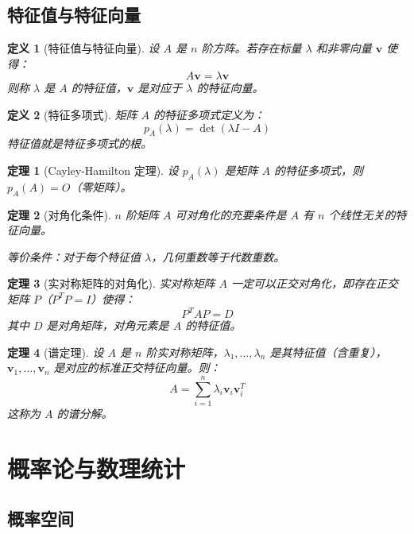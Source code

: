 \documentclass[12pt]{article}
\newtheorem{theorem}{定理}[section]
\newtheorem{definition}{定义}[section]
\begin{document}
\subsection{特征值与特征向量}

\begin{definition}[特征值与特征向量]
设 $A$ 是 $n$ 阶方阵。若存在标量 $\lambda$ 和非零向量 $\mathbf{v}$ 使得：
$$A\mathbf{v} = \lambda\mathbf{v}$$
则称 $\lambda$ 是 $A$ 的特征值，$\mathbf{v}$ 是对应于 $\lambda$ 的特征向量。
\end{definition}

\begin{definition}[特征多项式]
矩阵 $A$ 的特征多项式定义为：
$$p_A(\lambda) = \det(\lambda I - A)$$
特征值就是特征多项式的根。
\end{definition}

\begin{theorem}[Cayley-Hamilton 定理]
设 $p_A(\lambda)$ 是矩阵 $A$ 的特征多项式，则 $p_A(A) = O$（零矩阵）。
\end{theorem}

\begin{theorem}[对角化条件]
$n$ 阶矩阵 $A$ 可对角化的充要条件是 $A$ 有 $n$ 个线性无关的特征向量。

等价条件：对于每个特征值 $\lambda$，几何重数等于代数重数。
\end{theorem}

\begin{theorem}[实对称矩阵的对角化]
实对称矩阵 $A$ 一定可以正交对角化，即存在正交矩阵 $P$（$P^T P = I$）使得：
$$P^T A P = D$$
其中 $D$ 是对角矩阵，对角元素是 $A$ 的特征值。
\end{theorem}

\begin{theorem}[谱定理]
设 $A$ 是 $n$ 阶实对称矩阵，$\lambda_1, \ldots, \lambda_n$ 是其特征值（含重复），$\mathbf{v}_1, \ldots, \mathbf{v}_n$ 是对应的标准正交特征向量。则：
$$A = \sum_{i=1}^{n} \lambda_i \mathbf{v}_i \mathbf{v}_i^T$$
这称为 $A$ 的谱分解。
\end{theorem}


\section{概率论与数理统计}

\subsection{概率空间}
\end{document}
